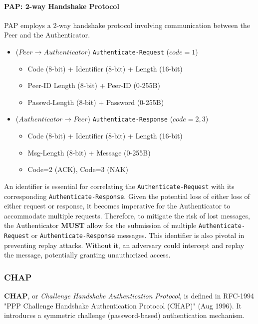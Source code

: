 \paragraph{PAP: 2-way Handshake Protocol}
PAP employs a 2-way handshake protocol involving communication between the Peer and the Authenticator.

\begin{itemize}
    \item ($Peer \rightarrow Authenticator$) \texttt{Authenticate-Request} ($code=1$)
    \begin{itemize}
        \item Code (8-bit) + Identifier (8-bit) + Length (16-bit)
        \item Peer-ID Length (8-bit) + Peer-ID (0-255B)
        \item Passwd-Length (8-bit) + Password (0-255B)
    \end{itemize}
    \item ($Authenticator \rightarrow Peer$) \texttt{Authenticate-Response} ($code= 2, 3$)
    \begin{itemize}
        \item Code (8-bit) + Identifier (8-bit) + Length (16-bit)
        \item Msg-Length (8-bit) + Message (0-255B)
        \item Code=2 (ACK), Code=3 (NAK)
    \end{itemize}
\end{itemize}

An identifier is essential for correlating the \texttt{Authenticate-Request} with its corresponding \texttt{Authenticate-Response}. Given the potential loss of either loss of either request or response, it becomes imperative for the Authenticator to accommodate multiple requests. Therefore, to mitigate the risk of lost messages, the Authenticator \textbf{MUST} allow for the submission of multiple \texttt{Authenticate-Request} or \texttt{Authenticate-Response} messages.
This identifier is also pivotal in preventing replay attacks. Without it, an adversary could intercept and replay the message, potentially granting unauthorized access.



\subsubsection{CHAP}
\textbf{CHAP}, or \textit{Challenge Handshake Authentication Protocol}, is defined in RFC-1994 "PPP Challenge Handshake Authentication Protocol (CHAP)" (Aug 1996). It introduces a symmetric challenge (password-based) authentication mechanism. 

